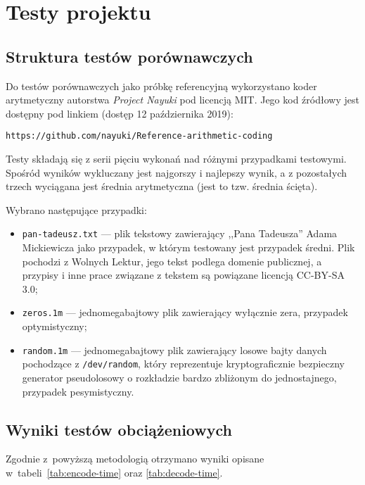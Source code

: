\documentclass[../../praca.tex]{subfiles}
\begin{document}
\chapter{Testy projektu}

\section{Struktura testów porównawczych}

Do testów porównawczych jako próbkę referencyjną
wykorzystano koder arytmetyczny autorstwa \emph{Project Nayuki}
pod licencją MIT. Jego kod źródłowy jest dostępny pod linkiem (dostęp
12 października 2019):

\begin{center}
\verb|https://github.com/nayuki/Reference-arithmetic-coding|
\end{center}

Testy składają się z serii pięciu wykonań nad różnymi przypadkami
testowymi. Spośród wyników wykluczany jest najgorszy i najlepszy
wynik, a z pozostałych trzech wyciągana jest średnia arytmetyczna
(jest to tzw. średnia ścięta).

Wybrano następujące przypadki:
\begin{itemize}
  \item \texttt{pan-tadeusz.txt} --- plik tekstowy zawierający
    ,,Pana Tadeusza'' Adama Mickiewicza jako przypadek, w którym
    testowany jest przypadek średni. Plik pochodzi z Wolnych Lektur,
    jego tekst podlega domenie publicznej, a przypisy i inne
    prace związane z tekstem są powiązane licencją CC-BY-SA 3.0;
  \item \texttt{zeros.1m} --- jednomegabajtowy plik zawierający
    wyłącznie zera, przypadek optymistyczny;
  \item \texttt{random.1m} --- jednomegabajtowy plik zawierający 
    losowe bajty danych pochodzące z \texttt{/dev/random}, który
    reprezentuje kryptograficznie bezpieczny generator pseudolosowy
    o rozkładzie bardzo zbliżonym do jednostajnego, przypadek
    pesymistyczny.
\end{itemize}

\section{Wyniki testów obciążeniowych}

Zgodnie z~powyższą metodologią otrzymano wyniki opisane 
w~tabeli~\ref{tab:encode-time} oraz \ref{tab:decode-time}.
\end{document}
